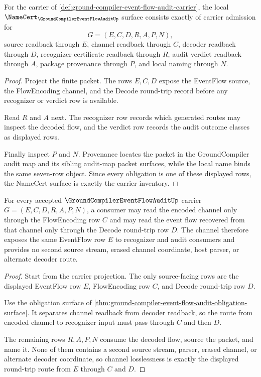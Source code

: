 \begin{theorem}
\label{thm:ground-compiler-event-flow-audit-obligation-surface}
For the carrier of \autoref{def:ground-compiler-event-flow-audit-carrier}, the local $\NameCert_{\GroundCompilerEventFlowAuditUp}$ surface consists exactly of carrier admission for
$$
G=(E,C,D,R,A,P,N),
$$
source readback through $E$, channel readback through $C$, decoder readback through $D$, recognizer certificate readback through $R$, audit verdict readback through $A$, package provenance through $P$, and local naming through $N$.
\end{theorem}
\begin{proof}
Project the finite packet. The rows $E,C,D$ expose the EventFlow source, the FlowEncoding channel, and the Decode round-trip record before any recognizer or verdict row is available.

Read $R$ and $A$ next. The recognizer row records which generated routes may inspect the decoded flow, and the verdict row records the audit outcome classes as displayed rows.

Finally inspect $P$ and $N$. Provenance locates the packet in the GroundCompiler audit map and its sibling audit-map packet surfaces, while the local name binds the same seven-row object. Since every obligation is one of these displayed rows, the NameCert surface is exactly the carrier inventory.
\end{proof}

\begin{theorem}
\label{thm:ground-compiler-event-flow-audit-channel-losslessness}
For every accepted $\GroundCompilerEventFlowAuditUp$ carrier $G=(E,C,D,R,A,P,N)$, a consumer may read the encoded channel only through the FlowEncoding row $C$ and may read the event flow recovered from that channel only through the Decode round-trip row $D$. The channel therefore exposes the same EventFlow row $E$ to recognizer and audit consumers and provides no second source stream, erased channel coordinate, host parser, or alternate decoder route.
\end{theorem}
\begin{proof}
Start from the carrier projection. The only source-facing rows are the displayed EventFlow row $E$, FlowEncoding row $C$, and Decode round-trip row $D$.

Use the obligation surface of \autoref{thm:ground-compiler-event-flow-audit-obligation-surface}. It separates channel readback from decoder readback, so the route from encoded channel to recognizer input must pass through $C$ and then $D$.

The remaining rows $R,A,P,N$ consume the decoded flow, source the packet, and name it. None of them contains a second source stream, parser, erased channel, or alternate decoder coordinate, so channel losslessness is exactly the displayed round-trip route from $E$ through $C$ and $D$.
\end{proof}

